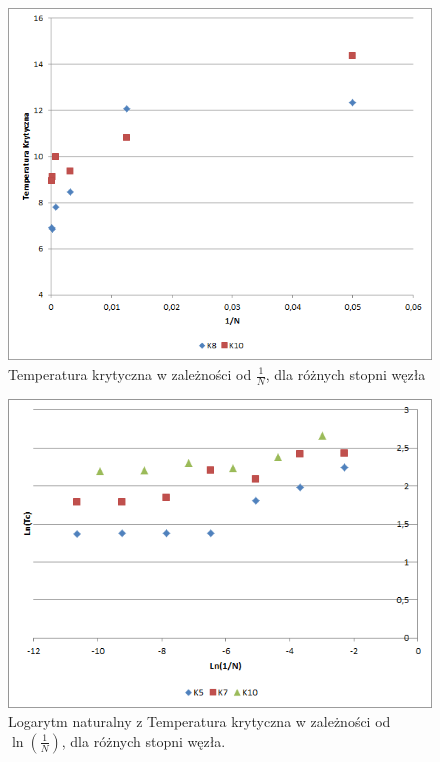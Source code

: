 \documentclass[12pt,a4paper]{article}
\begin{document}
\begin{figure}
\includegraphics[width=\textwidth]{K8K10.png}
\caption{Temperatura krytyczna w zależności od $\frac{1}{N}$, dla różnych stopni węzła}
\label{fig:TcOd1/N.2}
\end{figure}

\begin{figure}
\includegraphics[width=\textwidth]{LNK5K7K10.png}
\caption{Logarytm naturalny z Temperatura krytyczna w zależności od $\ln(\frac{1}{N})$, dla różnych stopni węzła.}
\label{fig:LnTcOd1/N.1}
\end{figure}
\end{document}

